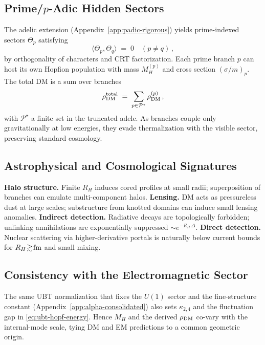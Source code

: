 \subsection{Prime/$p$-Adic Hidden Sectors}
The adelic extension (Appendix~\ref{app:padic-rigorous}) yields prime-indexed sectors $\Theta_p$ satisfying
\begin{equation}
\langle \Theta_p,\Theta_q\rangle \;=\; 0 \quad (p\neq q)\,,
\end{equation}
by orthogonality of characters and CRT factorization.
Each prime branch $p$ can host its own Hopfion population with mass $M_H^{(p)}$ and cross section $(\sigma/m)_p$.
The total DM is a sum over branches
\begin{equation}
\rho_{\rm DM}^{\rm total} \;=\; \sum_{p\in\mathcal{P}^\star}\rho_{\rm DM}^{(p)} \,,
\end{equation}
with $\mathcal{P}^\star$ a finite set in the truncated adele. As branches couple only gravitationally at low energies, they evade thermalization with the visible sector, preserving standard cosmology.

\subsection{Astrophysical and Cosmological Signatures}
\textbf{Halo structure.} Finite $R_H$ induces cored profiles at small radii; superposition of branches can emulate multi-component halos.
\textbf{Lensing.} DM acts as pressureless dust at large scales; substructure from knotted domains can induce small lensing anomalies.
\textbf{Indirect detection.} Radiative decays are topologically forbidden; unlinking annihilations are exponentially suppressed $\sim e^{-R_H\,\Delta}$.
\textbf{Direct detection.} Nuclear scattering via higher-derivative portals is naturally below current bounds for $R_H\!\gtrsim\!{\rm fm}$ and small mixing.

\subsection{Consistency with the Electromagnetic Sector}
The same UBT normalization that fixes the $U(1)$ sector and the fine-structure constant (Appendix~\ref{app:alpha-consolidated}) also sets $\kappa_{2,4}$ and the fluctuation gap in \eqref{eq:ubt-hopf-energy}.
Hence $M_H$ and the derived $\rho_{\rm DM}$ co-vary with the internal-mode scale, tying DM and EM predictions to a common geometric origin.

